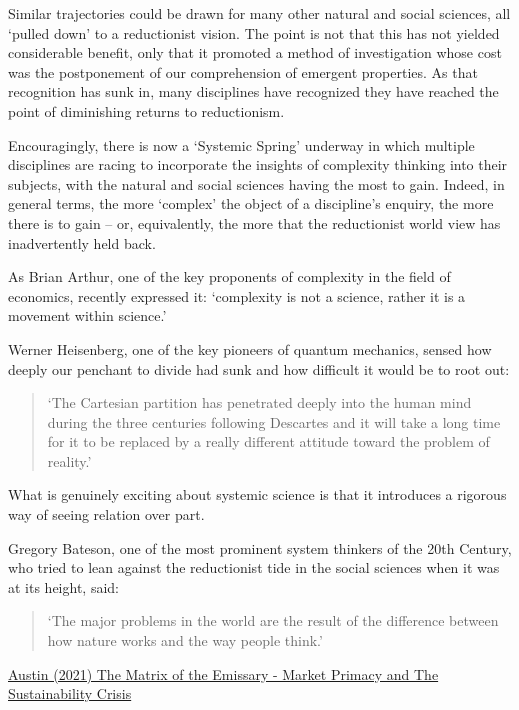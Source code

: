 \documentclass[
]{book}
\begin{document}
Similar trajectories could be drawn for many other natural and social sciences, all `pulled down' to a reductionist vision. The point is not that this has not yielded considerable benefit, only that it promoted a method of investigation whose cost was the postponement of our comprehension of emergent properties. As that recognition has sunk in, many disciplines have recognized they have reached the point of diminishing returns to reductionism.

Encouragingly, there is now a `Systemic Spring' underway in which multiple disciplines are racing to incorporate the insights of complexity thinking into their subjects, with the natural and social sciences having the most to gain. Indeed, in general terms, the more `complex' the object of a discipline's enquiry, the more there is to gain -- or, equivalently, the more that the reductionist world view has inadvertently held back.

As Brian Arthur, one of the key proponents of complexity in the field of economics, recently expressed it: `complexity is not a science, rather it is a movement within science.'

Werner Heisenberg, one of the key pioneers of quantum mechanics, sensed how deeply our penchant to divide had sunk and how difficult it would be to root out:

\begin{quote}
`The Cartesian partition has penetrated deeply into the human mind during the three centuries following Descartes and it will take a long time for it to be replaced by a really different attitude toward the problem of reality.'
\end{quote}

What is genuinely exciting about systemic science is that it introduces a rigorous way of seeing relation over part.

Gregory Bateson, one of the most prominent system thinkers of the 20th Century, who tried to lean against the reductionist tide in the social sciences when it was at its height, said:

\begin{quote}
`The major problems in the world are the result of the difference between how nature works and the way people think.'
\end{quote}

\href{https://channelmcgilchrist.com/articles/the-matrix-of-the-emissary/}{Austin (2021) The Matrix of the Emissary - Market Primacy and The Sustainability Crisis}
\end{document}
